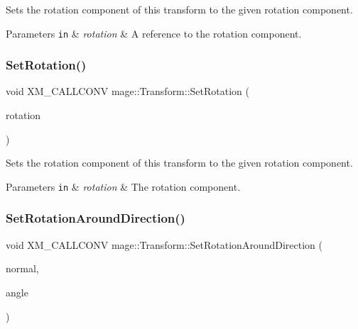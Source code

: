 Sets the rotation component of this transform to the given rotation component.


\begin{DoxyParams}[1]{Parameters}
\mbox{\tt in}  & {\em rotation} & A reference to the rotation component. \\
\hline
\end{DoxyParams}
\hypertarget{classmage_1_1_transform_a66ddc77bfbbf0b66e00d5ec8e10d1d65}{}\label{classmage_1_1_transform_a66ddc77bfbbf0b66e00d5ec8e10d1d65} 
\subsubsection{\texorpdfstring{Set\+Rotation()}{SetRotation()}\hspace{0.1cm}{\footnotesize\ttfamily [3/3]}}
{\footnotesize\ttfamily void X\+M\+\_\+\+C\+A\+L\+L\+C\+O\+NV mage\+::\+Transform\+::\+Set\+Rotation (\begin{DoxyParamCaption}\item[{F\+X\+M\+V\+E\+C\+T\+OR}]{rotation }\end{DoxyParamCaption})\hspace{0.3cm}{\ttfamily [noexcept]}}

Sets the rotation component of this transform to the given rotation component.


\begin{DoxyParams}[1]{Parameters}
\mbox{\tt in}  & {\em rotation} & The rotation component. \\
\hline
\end{DoxyParams}
\hypertarget{classmage_1_1_transform_a8d829e3aeef9a2a529ceb405b7b36c64}{}\label{classmage_1_1_transform_a8d829e3aeef9a2a529ceb405b7b36c64} 
\subsubsection{\texorpdfstring{Set\+Rotation\+Around\+Direction()}{SetRotationAroundDirection()}}
{\footnotesize\ttfamily void X\+M\+\_\+\+C\+A\+L\+L\+C\+O\+NV mage\+::\+Transform\+::\+Set\+Rotation\+Around\+Direction (\begin{DoxyParamCaption}\item[{F\+X\+M\+V\+E\+C\+T\+OR}]{normal,  }\item[{\hyperlink{namespacemage_aa97e833b45f06d60a0a9c4fc22ae02c0}{F32}}]{angle }\end{DoxyParamCaption})\hspace{0.3cm}{\ttfamily [noexcept]}}

